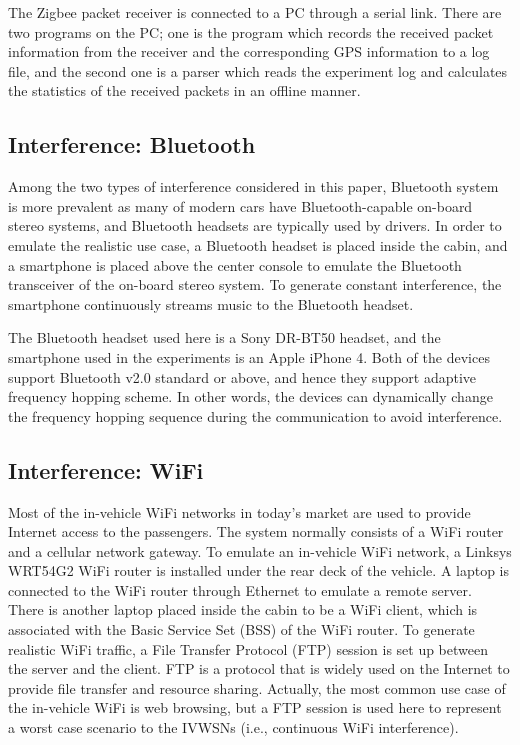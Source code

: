 \documentclass[journal]{IEEEtran}
\begin{document}
The Zigbee packet receiver is connected to a PC through a serial link. There are two programs on the PC; one is the program which records the received packet information from the receiver and the corresponding GPS information to a log file, and the second one is a parser which reads the experiment log and calculates the statistics of the received packets in an offline manner. 






\subsection{Interference: Bluetooth}


Among the two types of interference considered in this paper, Bluetooth system is more prevalent as many of modern cars have Bluetooth-capable on-board stereo systems, and Bluetooth headsets are typically used by drivers. In order to emulate the realistic use case, a Bluetooth headset is placed inside the cabin, and a smartphone is placed above the center console to emulate the Bluetooth transceiver of the on-board stereo system. To generate constant interference, the smartphone continuously streams music to the Bluetooth headset.

The Bluetooth headset used here is a Sony DR-BT50 headset, and the smartphone used in the experiments is an Apple iPhone 4. Both of the devices support Bluetooth v2.0 standard or above, and hence they support adaptive frequency hopping scheme. In other words, the devices can dynamically change the frequency hopping sequence during the communication to avoid interference.

\subsection{Interference: WiFi}
Most of the in-vehicle WiFi networks in today's market are used to provide Internet access to the passengers. The system normally consists of a WiFi router and a cellular network gateway. To emulate an in-vehicle WiFi network, a Linksys WRT54G2 WiFi router is installed under the rear deck of the vehicle. A laptop is connected to the WiFi router through Ethernet to emulate a remote server. There is another laptop placed inside the cabin to be a WiFi client, which is associated with the Basic Service Set (BSS) of the WiFi router. To generate realistic WiFi traffic, a File Transfer Protocol (FTP) session is set up between the server and the client. FTP is a protocol that is widely used on the Internet to provide file transfer and resource sharing. Actually, the most common use case of the in-vehicle WiFi is web browsing, but a FTP session is used here to represent a worst case scenario to the IVWSNs (i.e., continuous WiFi interference).
\end{document}
